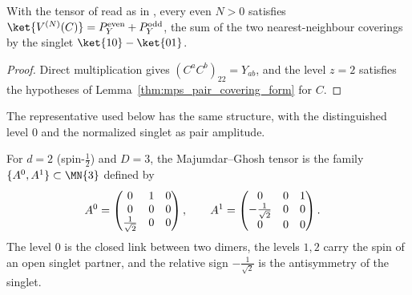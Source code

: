 \begin{lemma}%
    \label{thm:majumdar_ghosh_bond_singlet_mpv}
    \leanok
    With the tensor of \cite[Appendix~A, ``The Majumdar-Ghosh model'']{Cirac2021Matrix}
    read as in \cite{gap:rmp_majumdar_ghosh_tensor_gap}, every even $N>0$
    satisfies $\ket{V^{(N)}(C)}=P^{\mathrm{even}}_Y+P^{\mathrm{odd}}_Y$, the
    sum of the two nearest-neighbour coverings by the singlet
    $\ket{10}-\ket{01}$.
\end{lemma}

\begin{proof}
    \leanok
    Direct multiplication gives $(C^aC^b)_{22}=Y_{ab}$, and the level $z=2$
    satisfies the hypotheses of Lemma~\ref{thm:mps_pair_covering_form} for
    $C$.
\end{proof}

The representative used below has the same structure, with the distinguished
level $0$ and the normalized singlet as pair amplitude.

\begin{definition}\label{def:majumdar_ghosh_tensor}
    \leanok
    For $d = 2$ (spin-$\tfrac12$) and $D = 3$, the Majumdar--Ghosh tensor is
    the family $\{A^0, A^1\} \subset \MN{3}$ defined by
    \begin{align}
        A^0 & =
        \begin{pmatrix}
            0               & 1 & 0 \\
            0               & 0 & 0 \\
            \tfrac1{\sqrt2} & 0 & 0
        \end{pmatrix},
        \qquad
        A^1 =
        \begin{pmatrix}
            0                & 0 & 1 \\
            -\tfrac1{\sqrt2} & 0 & 0 \\
            0                & 0 & 0
        \end{pmatrix}.
        \notag
    \end{align}
    The level $0$ is the closed link between two dimers, the levels $1,2$ carry
    the spin of an open singlet partner, and the relative sign
    $-\tfrac1{\sqrt2}$ is the antisymmetry of the singlet.
\end{definition}

